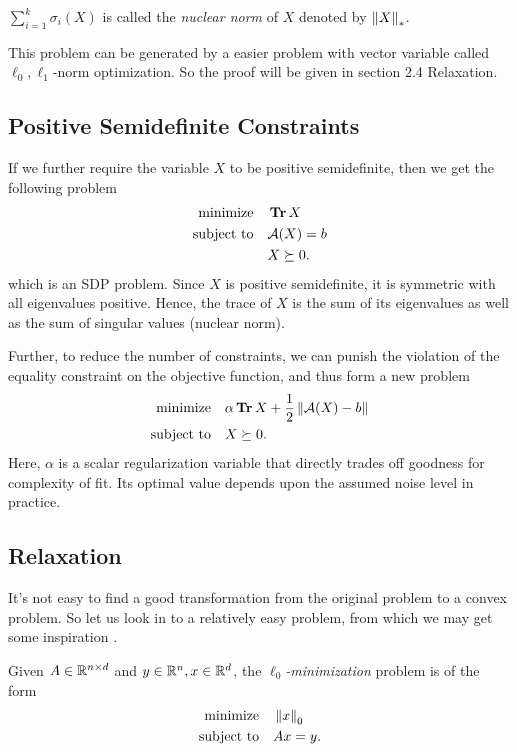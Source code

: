 \documentclass[11pt]{article}
\begin{document}
\begin{remark}
   \(\sum_{i=1}^{k} \sigma_i(X)\) is called the \emph{nuclear norm} of \(X\) denoted by \(\left\|X\right\|_*\).
\end{remark}

This problem can be generated by a easier problem with vector variable called \(\ell_0,\ell_1\)-norm optimization. So the proof will be given in section 2.4 Relaxation.

\subsection{Positive Semidefinite Constraints}

If we further require the variable \(X\) to be positive semidefinite, then we get the following problem 
\[\begin{aligned}
    \textnormal{minimize}\quad & \operatorname{\mathbf{Tr}} X\\
    \textnormal{subject to}\quad & \mathcal A(X)=b\\
    & X\succeq 0.
\end{aligned}\]
which is an SDP problem. Since \(X\) is positive semidefinite, it is symmetric with all eigenvalues positive. Hence, the trace of \(X\) is the sum of its eigenvalues as well as the sum of singular values (nuclear norm).

Further, to reduce the number of constraints, we can punish the violation of the equality constraint on the objective function, and thus form a new problem
\[\begin{aligned}
    \textnormal{minimize}\quad & \alpha\operatorname{\mathbf{Tr}} X+\frac12\left\|\mathcal A(X)-b\right\|\\
    \textnormal{subject to}\quad & X\succeq 0.
\end{aligned}\]
Here, \(\alpha\) is a scalar regularization variable that directly trades off goodness for complexity of fit. Its optimal value depends upon the assumed noise level in practice.

\subsection{Relaxation}

It's not easy to find a good transformation from the original problem to a convex problem. So let us look in to a relatively easy problem, from which we may get some inspiration \cite{horstmeyer2015solving}.

\begin{definition}
    Given \(A\in\mathbb R^{n\times d}\) and \(y\in\mathbb R^n,x\in\mathbb R^d\), the \emph{\(\ell_0\)-minimization} problem is of the form
    \[\begin{aligned}
        \textnormal{minimize}\quad & \left\|x\right\|_0\\
        \textnormal{subject to}\quad & Ax=y.
    \end{aligned}\]
\end{definition}
\end{document}
